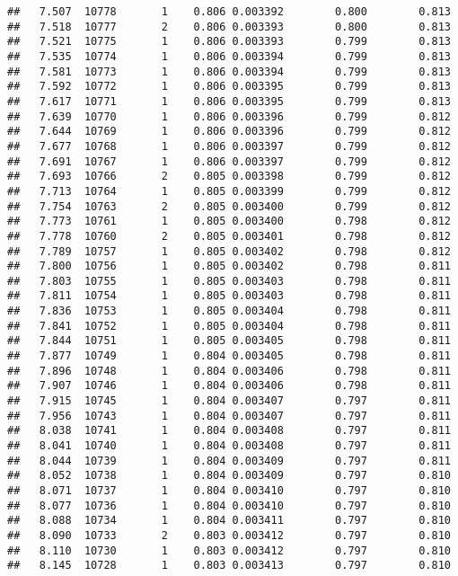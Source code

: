 \documentclass[
]{book}
\begin{document}
\begin{verbatim}
##   7.507  10778       1    0.806 0.003392        0.800        0.813
##   7.518  10777       2    0.806 0.003393        0.800        0.813
##   7.521  10775       1    0.806 0.003393        0.799        0.813
##   7.535  10774       1    0.806 0.003394        0.799        0.813
##   7.581  10773       1    0.806 0.003394        0.799        0.813
##   7.592  10772       1    0.806 0.003395        0.799        0.813
##   7.617  10771       1    0.806 0.003395        0.799        0.813
##   7.639  10770       1    0.806 0.003396        0.799        0.812
##   7.644  10769       1    0.806 0.003396        0.799        0.812
##   7.677  10768       1    0.806 0.003397        0.799        0.812
##   7.691  10767       1    0.806 0.003397        0.799        0.812
##   7.693  10766       2    0.805 0.003398        0.799        0.812
##   7.713  10764       1    0.805 0.003399        0.799        0.812
##   7.754  10763       2    0.805 0.003400        0.799        0.812
##   7.773  10761       1    0.805 0.003400        0.798        0.812
##   7.778  10760       2    0.805 0.003401        0.798        0.812
##   7.789  10757       1    0.805 0.003402        0.798        0.812
##   7.800  10756       1    0.805 0.003402        0.798        0.811
##   7.803  10755       1    0.805 0.003403        0.798        0.811
##   7.811  10754       1    0.805 0.003403        0.798        0.811
##   7.836  10753       1    0.805 0.003404        0.798        0.811
##   7.841  10752       1    0.805 0.003404        0.798        0.811
##   7.844  10751       1    0.805 0.003405        0.798        0.811
##   7.877  10749       1    0.804 0.003405        0.798        0.811
##   7.896  10748       1    0.804 0.003406        0.798        0.811
##   7.907  10746       1    0.804 0.003406        0.798        0.811
##   7.915  10745       1    0.804 0.003407        0.797        0.811
##   7.956  10743       1    0.804 0.003407        0.797        0.811
##   8.038  10741       1    0.804 0.003408        0.797        0.811
##   8.041  10740       1    0.804 0.003408        0.797        0.811
##   8.044  10739       1    0.804 0.003409        0.797        0.811
##   8.052  10738       1    0.804 0.003409        0.797        0.810
##   8.071  10737       1    0.804 0.003410        0.797        0.810
##   8.077  10736       1    0.804 0.003410        0.797        0.810
##   8.088  10734       1    0.804 0.003411        0.797        0.810
##   8.090  10733       2    0.803 0.003412        0.797        0.810
##   8.110  10730       1    0.803 0.003412        0.797        0.810
##   8.145  10728       1    0.803 0.003413        0.797        0.810

\end{verbatim}
\end{document}
